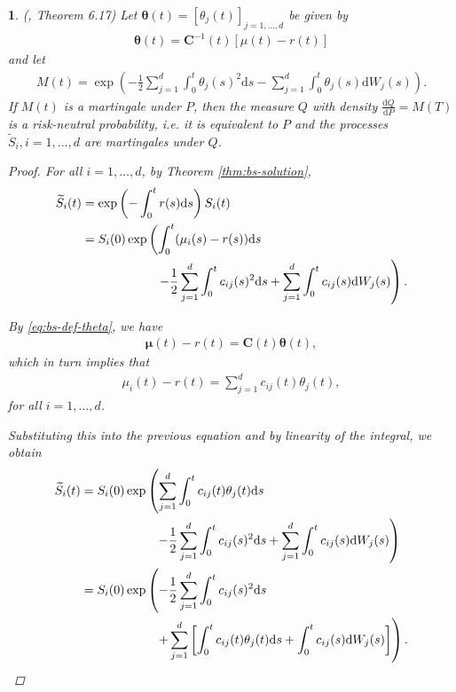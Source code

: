 \documentclass[english]{article}
\numberwithin{equation}{section}
\numberwithin{figure}{section}
\theoremstyle{bolddescit}
\newtheorem{theorem}{\protect\theoremname}[section]
\theoremstyle{definition}
\theoremstyle{definition}
\theoremstyle{plain}
\theoremstyle{plain}
\theoremstyle{bolddesc}
\theoremstyle{plain}
\theoremstyle{remark}
\providecommand{\theoremname}{Theorem}
\begin{document}
\begin{theorem}
  (\cite{capinski_blackscholes_2012}, Theorem 6.17)
  Let $\mathbf{\theta}(t) = [\theta_j(t)]_{j=1,\ldots,d}$ be given by
  \begin{align}\label{eq:bs-def-theta}
    \mathbf{\theta}(t) = \mathbf{C}^{-1}(t) [\mu(t) - r(t)]
  \end{align}
  and let
  \begin{align*}
    M(t) = \exp \left( - \frac{1}{2} \sum_{j=1}^d \int_0^t \theta_j(s)^2 \mathrm{d}s - \sum_{j=1}^d \int_0^t \theta_j(s) \mathrm{d}W_j(s) \right).
  \end{align*}
  If $M(t)$ is a martingale under $P$, then the measure $Q$ with density $\frac{\mathrm{d}Q}{\mathrm{d}P} = M(T)$ is a risk-neutral probability, i.e. it is equivalent to $P$ and the processes $\widetilde{S}_i, i=1,\ldots,d$ are martingales under $Q$.

  \begin{proof}
    For all $i=1,\ldots,d$, by Theorem \ref{thm:bs-solution},
    \begin{align*}
      \widetilde{S}_i(t)
      &= \exp\left(- \int_0^t r(s)\mathrm{d}s\right) S_i(t)\\
      &= S_i(0) \exp \left( \int_0^t (\mu_i(s) - r(s)) \mathrm{d}s \right.\\
      &\hspace*{60pt} \left. - \frac{1}{2} \sum_{j=1}^{d} \int_0^t c_{ij}(s)^2 \mathrm{d}s + \sum_{j=1}^d \int_0^t c_{ij}(s) \mathrm{d}W_j(s) \right).
    \end{align*}

    By \eqref{eq:bs-def-theta}, we have
    \begin{align*}
      \mathbf{\mu}(t) - r(t) = \mathbf{C}(t) \mathbf{\theta}(t),
    \end{align*}
    which in turn implies that
    \begin{align*}
      \mu_i(t) - r(t) = \sum_{j=1}^d c_{ij}(t) \theta_j(t),
    \end{align*}
    for all $i=1,\ldots,d$.

    Substituting this into the previous equation and by linearity of the integral, we obtain
    \begin{align}
      \widetilde{S}_i(t)
      &= S_i(0) \exp \left( \sum_{j=1}^d \int_0^t c_{ij}(t) \theta_j(t) \mathrm{d}s \right.\notag\\
      &\hspace*{60pt} \left. - \frac{1}{2} \sum_{j=1}^{d} \int_0^t c_{ij}(s)^2 \mathrm{d}s + \sum_{j=1}^d \int_0^t c_{ij}(s) \mathrm{d}W_j(s) \right)\notag\\
      &= S_i(0) \exp \left( - \frac{1}{2} \sum_{j=1}^{d} \int_0^t c_{ij}(s)^2 \mathrm{d}s \right.\notag\\
      &\hspace*{60pt} \left. + \sum_{j=1}^d \left[\int_0^t c_{ij}(t) \theta_j(t) \mathrm{d}s + \int_0^t c_{ij}(s) \mathrm{d}W_j(s) \right]\right).\label{eq:bs-risk-neutral-before-product-rule}
    \end{align}


\end{proof}
\end{theorem}
\end{document}
